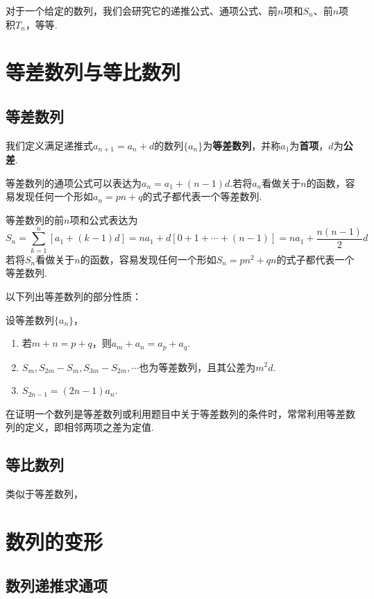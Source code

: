 \documentclass[lang=cn, zihao=4.5]{elegantbook}
\begin{document}
对于一个给定的数列，我们会研究它的递推公式、通项公式、前$n$项和$S_n$、前$n$项积$T_n$，等等.

\section{等差数列与等比数列}

\subsection{等差数列}

我们定义满足递推式$a_{n+1}=a_n+d$的数列$\{ a_n \}$为\textbf{等差数列}，并称$a_1$为\textbf{首项}，$d$为\textbf{公差}.

等差数列的通项公式可以表达为$a_n=a_1+(n-1)d$.若将$a_n$看做关于$n$的函数，容易发现任何一个形如$a_n=pn+q$的式子都代表一个等差数列.

等差数列的前$n$项和公式表达为$$S_n = \sum _{k=1}^{n} [a_1+(k-1)d] = na_1 + d[0+ 1 + \cdots +(n-1)] = na_1 + \frac{n(n-1)}{2}d$$
若将$S_n$看做关于$n$的函数，容易发现任何一个形如$S_n=pn^2+qn$的式子都代表一个等差数列.

以下列出等差数列的部分性质：

\begin{proposition}
	设等差数列$\{ a_n \}$，
	\begin{enumerate}
		\item 若$m+n=p+q$，则$a_m+a_n=a_p+a_q$.
		\item $S_m,S_{2m}-S_m,S_{3m}-S_{2m},\cdots $也为等差数列，且其公差为$m^2d$.
		\item $S_{2n-1}=(2n-1)a_n$.
	\end{enumerate}
\end{proposition}

在证明一个数列是等差数列或利用题目中关于等差数列的条件时，常常利用等差数列的定义，即相邻两项之差为定值.

\subsection{等比数列}

类似于等差数列，

\section{数列的变形}

\subsection{数列递推求通项}
\end{document}
